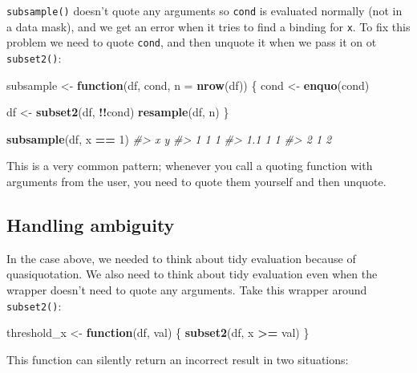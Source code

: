\documentclass[]{book}
\newenvironment{Shaded}{\begin{snugshade}}{\end{snugshade}}
\newcommand{\CommentTok}[1]{\textcolor[rgb]{0.37,0.37,0.37}{\textit{#1}}}
\newcommand{\ControlFlowTok}[1]{\textcolor[rgb]{0.27,0.27,0.27}{\textbf{#1}}}
\newcommand{\DataTypeTok}[1]{\textcolor[rgb]{0.27,0.27,0.27}{#1}}
\newcommand{\DecValTok}[1]{\textcolor[rgb]{0.06,0.06,0.06}{#1}}
\newcommand{\KeywordTok}[1]{\textcolor[rgb]{0.27,0.27,0.27}{\textbf{#1}}}
\newcommand{\NormalTok}[1]{#1}
\newcommand{\OperatorTok}[1]{\textcolor[rgb]{0.43,0.43,0.43}{\textbf{#1}}}
\newcommand{\StringTok}[1]{\textcolor[rgb]{0.5,0.5,0.5}{#1}}
\begin{document}
\texttt{subsample()} doesn't quote any arguments so \texttt{cond} is evaluated normally (not in a data mask), and we get an error when it tries to find a binding for \texttt{x}. To fix this problem we need to quote \texttt{cond}, and then unquote it when we pass it on ot \texttt{subset2()}:

\begin{Shaded}
\begin{Highlighting}[]
\NormalTok{subsample <-}\StringTok{ }\ControlFlowTok{function}\NormalTok{(df, cond, }\DataTypeTok{n =} \KeywordTok{nrow}\NormalTok{(df)) \{}
\NormalTok{  cond <-}\StringTok{ }\KeywordTok{enquo}\NormalTok{(cond)}

\NormalTok{  df <-}\StringTok{ }\KeywordTok{subset2}\NormalTok{(df, }\OperatorTok{!!}\NormalTok{cond)}
  \KeywordTok{resample}\NormalTok{(df, n)}
\NormalTok{\}}

\KeywordTok{subsample}\NormalTok{(df, x }\OperatorTok{==}\StringTok{ }\DecValTok{1}\NormalTok{)}
\CommentTok{#>     x y}
\CommentTok{#> 1   1 1}
\CommentTok{#> 1.1 1 1}
\CommentTok{#> 2   1 2}
\end{Highlighting}
\end{Shaded}

This is a very common pattern; whenever you call a quoting function with arguments from the user, you need to quote them yourself and then unquote.

\hypertarget{handling-ambiguity}{%
\subsection{Handling ambiguity}\label{handling-ambiguity}}


In the case above, we needed to think about tidy evaluation because of quasiquotation. We also need to think about tidy evaluation even when the wrapper doesn't need to quote any arguments. Take this wrapper around \texttt{subset2()}:

\begin{Shaded}
\begin{Highlighting}[]
\NormalTok{threshold_x <-}\StringTok{ }\ControlFlowTok{function}\NormalTok{(df, val) \{}
  \KeywordTok{subset2}\NormalTok{(df, x }\OperatorTok{>=}\StringTok{ }\NormalTok{val)}
\NormalTok{\}}
\end{Highlighting}
\end{Shaded}

This function can silently return an incorrect result in two situations:
\end{document}
